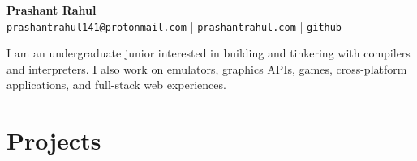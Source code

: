\documentclass[a4paper,11pt]{article}
\begin{document}
\begin{center}
    {\huge \textbf{Prashant Rahul}} \\
    {\footnotesize \texttt{\href{mailto:prashantrahul141@protonmail.com}{prashantrahul141@protonmail.com}} |
    \texttt{\href{https://prashantrahul.com}{prashantrahul.com}} |
    \texttt{\href{https://github.com/prashantrahul141}{github}}} \\
\end{center}

\noindent
I am an undergraduate junior interested in building and tinkering with compilers and interpreters. I also work on emulators, graphics APIs, games, cross-platform applications, and full-stack web experiences.

\section*{Projects}
\end{document}
